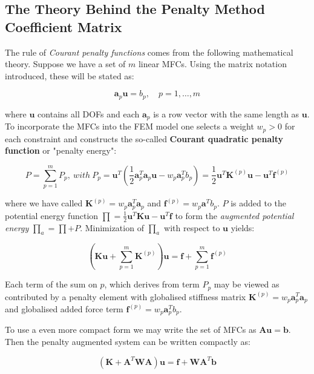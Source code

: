 \documentclass[10pt,b5paper,titlepage]{book}
\newcommand{\m}{\mathbf}
\begin{document}
\subsection{The Theory Behind the Penalty Method Coefficient Matrix}

The rule of \textit{Courant penalty functions} comes from the following
mathematical theory. Suppose we have a set of $ m $ linear MFCs. Using
the matrix notation introduced, these will be stated as:

\begin{equation}
    \m{a}_p \m{u} = b_p, \quad p = 1, \dots, m
\end{equation}

where $ \m{u} $ contains all DOFs and each $ \m{a}_p $ is a row vector
with the same length as $ \m{u} $. To incorporate the MFCs into the FEM
model one selects a weight $ w_p > 0 $ for each constraint and constructs the
so-called \textbf{Courant quadratic penalty function} or "penalty energy":

\begin{equation}
    P = \sum_{p=1}^m P_p,\ with\ 
    P_p = \m{u}^T \left(
        \frac{1}{2} \m{a}_p^T \m{a}_p \m{u}
        - w_p \m{a}_p^T b_p
        \right)
        = \frac{1}{2} \m{u}^T \m{K}^{(p)} \m{u}
        - \m{u}^T \m{f}^{(p)}
\end{equation}

where we have called $ \m{K}^{(p)} = w_p \m{a}_p^T \m{a}_p $
and $ \m{f}^{(p)} = w_p \m{a}^T b_p $. $ P $ is added to the potential
energy function
$ \prod = \frac{1}{2} \m{u}^T \m{K} \m{u} - \m{u}^T \m{f} $
to form the \textit{augmented potential energy} $ \prod_a = \prod + P $.
Minimization of $ \prod_a $ with respect to $ \m{u} $ yields:

\begin{equation}\label{mfc-augmented-potential-energy}
    \left( \m{K} \m{u} + \sum_{p=1}^m \m{K}^{(p)} \right) \m{u}
    = \m{f} + \sum_{p=1}^m \m{f}^{(p)}
\end{equation}

Each term of the sum on $ p $, which derives from term $ P_p $ may be viewed as
contributed by a penalty element with globalised stiffness matrix
$ \m{K}^{(p)} = w_p \m{a}_p^T \m{a}_p $ and globalised added
force term $ \m{f}^{(p)} = w_p \m{a}_p^T b_p $.

To use a even more compact form we may write the set of MFCs as
$ \m{A} \m{u} = \m{b} $. Then the penalty augmented system can
be written compactly as:

\begin{equation}
    \left( \m{K} + \m{A}^T \m{W} \m{A} \right) \m{u}
    = \m{f} + \m{W} \m{A}^T \m{b}
\end{equation}
\end{document}
